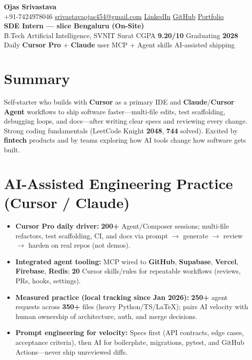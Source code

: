 \documentclass[a4paper,10pt]{article}
\begin{document}
\selectfont

\begin{center}
  {\LARGE \textbf{Ojas Srivastava}} \\[0.55mm]
  \small
  +91-7424978046 \textbar{}
  \href{mailto:srivastavaojas454@gmail.com}{srivastavaojas454@gmail.com} \textbar{}
  \href{https://linkedin.com/in/ojas-srivastava05}{LinkedIn} \textbar{}
  \href{https://github.com/Ojas-Srivastava05}{GitHub} \textbar{}
  \href{https://ojas-srivastava.vercel.app}{Portfolio} \\[0.2mm]
  \textbf{SDE Intern --- slice \textbar{} Bengaluru (On-Site)} \\[0.1mm]
  B.Tech Artificial Intelligence, SVNIT Surat \textbar{} CGPA \textbf{9.20/10} \textbar{} Graduating \textbf{2028} \\[0.1mm]
  Daily \textbf{Cursor Pro} + \textbf{Claude} user \textbar{} MCP + Agent skills \textbar{} AI-assisted shipping
\end{center}

\vspace{-0.5mm}

\section{Summary}
\small
Self-starter who builds with \textbf{Cursor} as a primary IDE and \textbf{Claude}/\textbf{Cursor Agent} workflows to ship software faster---multi-file edits, test scaffolding, debugging loops, and docs---after writing clear specs and reviewing every change. Strong coding fundamentals (LeetCode Knight \textbf{2048}, \textbf{744} solved). Excited by \textbf{fintech} products and by teams exploring how AI tools change how software gets built.

\section{AI-Assisted Engineering Practice (Cursor / Claude)}
\small
\begin{itemize}
  \item \textbf{Cursor Pro daily driver:} \textbf{200+} Agent/Composer sessions; multi-file refactors, test scaffolding, CI, and docs via prompt $\rightarrow$ generate $\rightarrow$ review $\rightarrow$ harden on real repos (not demos).
  \item \textbf{Integrated agent tooling:} MCP wired to \textbf{GitHub}, \textbf{Supabase}, \textbf{Vercel}, \textbf{Firebase}, \textbf{Redis}; \textbf{20} Cursor skills/rules for repeatable workflows (reviews, PRs, hooks, settings).
  \item \textbf{Measured practice (local tracking since Jan 2026):} \textbf{250+} agent requests across \textbf{350+} files (heavy Python/TS/LaTeX); pairs AI velocity with human ownership of architecture, auth, and merge decisions.
  \item \textbf{Prompt engineering for velocity:} Specs first (API contracts, edge cases, acceptance criteria), then AI for boilerplate, migrations, pytest, and GitHub Actions---never ship unreviewed diffs.
\end{itemize}
\end{document}
